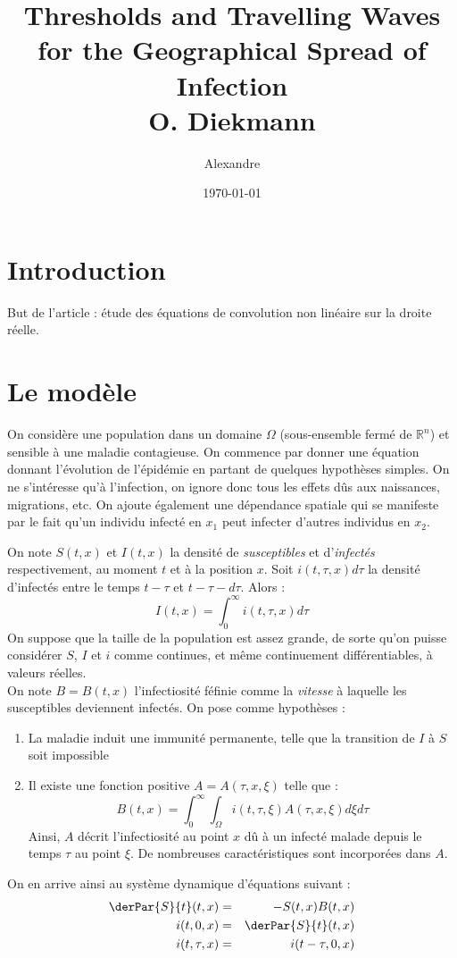 \documentclass{article}
\title{Thresholds and Travelling Waves for the Geographical Spread of Infection\\\small{O. Diekmann}}
\author{Alexandre \bsc{Vieira}}
\date{\today}
\begin{document}
\maketitle
\tableofcontents

\newpage

\section*{Introduction}
But de l'article : étude des équations de convolution non linéaire sur la droite réelle.

\section{Le modèle}
On considère une population dans un domaine $\Omega$ (sous-ensemble fermé de $\mathbb{R}^n$) et sensible à une maladie contagieuse. On commence par donner une équation donnant l'évolution de l'épidémie en partant de quelques hypothèses simples. On ne s'intéresse qu'à l'infection, on ignore donc tous les effets dûs aux naissances, migrations, etc. On ajoute également une dépendance spatiale qui se manifeste par le fait qu'un individu infecté en $x_1$ peut infecter d'autres individus en $x_2$.

\bigskip
On note $S(t,x)$ et $I(t,x)$ la densité de \textit{susceptibles} et d'\textit{infectés} respectivement, au moment $t$ et à la position $x$. Soit $i(t,\tau,x)d\tau$ la densité d'infectés entre le temps $t-\tau$ et $t-\tau-d\tau$. Alors :
\begin{equation} \label{2.1} I(t,x)=\int_0^\infty i(t,\tau,x)d\tau \end{equation}
On suppose que la taille de la population est assez grande, de sorte qu'on puisse considérer $S$, $I$ et $i$ comme continues, et même continuement différentiables, à valeurs réelles.\\
On note $B=B(t,x)$ l'infectiosité féfinie comme la \textit{vitesse} à laquelle les susceptibles deviennent infectés. On pose comme hypothèses :
\begin{enumerate}
	\item La maladie induit une immunité permanente, telle que la transition de $I$ à $S$ soit impossible
	\item Il existe une fonction positive $A=A(\tau,x,\xi)$ telle que :
\begin{equation} \label{2.2} B(t,x)=\int_0^\infty \int_\Omega i(t,\tau,\xi)A(\tau,x,\xi)d\xi d\tau \end{equation}
Ainsi, $A$ décrit l'infectiosité au point $x$ dû à un infecté malade depuis le temps $\tau$ au point $\xi$. De  nombreuses caractéristiques sont incorporées dans $A$.
\end{enumerate}
On en arrive ainsi au système dynamique d'équations suivant :
\begin{eqnarray}
\label{2.3} \derPar{S}{t}(t,x) &=& -S(t,x)B(t,x)\\
\label{2.4} i(t,0,x) &=& \derPar{S}{t}(t,x) \\
\label{2.5} i(t,\tau,x)&=&i(t-\tau,0,x)
\end{eqnarray}
\end{document}
